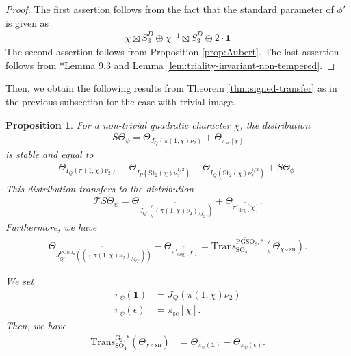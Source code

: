 \documentclass[12pt]{amsart}
\theoremstyle{definition}
\theoremstyle{plain}
\newtheorem{proposition}[definition]{Proposition}
\theoremstyle{remark}
\def\SO{\mathrm{SO}}
\def\PGSO{\mathrm{PGSO}}
\newcommand{\cT}{\mathcal{T}}
\numberwithin{equation}{section}
\newcommand{\rG}{\mathrm{G}}
\newcommand{\Trans}{\mathrm{Trans}}
\newcommand{\St}{\mathrm{St}}
\newcommand{\sn}{\mathrm{sn}}
\begin{document}
\begin{proof}
      The first assertion follows from the fact that the standard parameter of $\phi'$ is given as
      \begin{align*}
            \chi \boxtimes S_3^D \oplus \chi^{-1} \boxtimes S_3^D \oplus 2 \cdot \mathbf{1} 
      \end{align*}
      The second assertion follows from Proposition \ref{prop:Aubert}.
      The last assertion follows from \cite{Xu2024-ArthurPacketsQuasisplitGSp2nGO2n}*{Lemma 9.3} and Lemma \ref{lem:triality-invariant-non-tempered}.
\end{proof}

Then, we obtain the following results from Theorem \ref{thm:signed-transfer} as in the previous subsection for the case with trivial image.

\begin{proposition}\label{prop:subregular-quadratic-ecr}
      For a non-trivial quadratic character $\chi$, the distribution
      \begin{align*}
           S\Theta_{\psi} = \Theta_{J_Q(\pi(1, \chi) \nu_2)} + \Theta_{\pi_{\mathrm{sc}}[\chi]}
      \end{align*}
      is stable and equal to 
      \begin{align*}
            \Theta_{I_Q(\pi(1, \chi) \nu_2)} - \Theta_{I_P(\St_2(\chi)\nu_2^{1/2})} - \Theta_{I_Q(\St_2(\chi)\nu_2^{1/2})} + S\Theta_{\phi}.
      \end{align*}
      This distribution transfers to the distribution
      \begin{align*}
            \cT S\Theta_{\psi} 
            = 
            \Theta_{\widetilde{
                  J_{Q'}
            ((\pi(1, \chi)\nu_2)_{M_{Q'}})
            }} 
            +     
            \Theta_{\widetilde{\pi'_{\deg}[\chi]}}.
      \end{align*}
      Furthermore, we have 
      \begin{align*}
            \Theta_{\widetilde{
             J^{\PGSO_8}_{Q'}(((\pi(1, \chi)\nu_2)_{M_{Q'}}))
            }} 
            -
            \Theta_{\widetilde{\pi'_{\deg}[\chi]}}
            = 
            \Trans^{\widetilde{\PGSO_8}, *}_{\SO_4}(\Theta_{\chi \circ \sn}).
      \end{align*}

      We set 
      \begin{align*}
            \pi_{\psi}(\mathbf{1}) &= J_Q(\pi(1, \chi) \nu_2) \\
            \pi_{\psi}(\epsilon) &= \pi_{\mathrm{sc}}[\chi].
      \end{align*}
      Then, we have
      \begin{align*}
            \Trans^{\rG_2, *}_{\SO_4}(\Theta_{\chi \circ \sn}) &=
            \Theta_{\pi_{\psi}(\mathbf{1})} - \Theta_{\pi_{\psi}(\epsilon)}.
      \end{align*}
\end{proposition}
\end{document}

